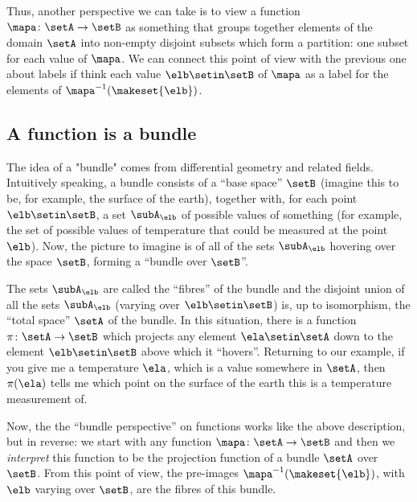 Thus, another perspective we can take is to view a function $\mapa \colon \setA \to \setB$ as something that groups together elements of the domain $\setA$ into non-empty disjoint subsets which form a partition: one subset for each value of $\mapa$. We can connect this point of view with the previous one about labels if think each value $\elb \setin \setB$ of $\mapa$ as a label for the elements of $\mapa^{-1}(\makeset{\elb})$.


\subsection{A function is a bundle}

The idea of a "bundle" comes from differential geometry and related fields. Intuitively speaking, a bundle consists of a ``base space'' $\setB$ (imagine this to be, for example, the surface of the earth), together with, for each point $\elb \setin \setB$, a set $\subA_\elb$ of possible values of something (for example, the set of possible values of temperature that could be measured at the point $\elb$). Now, the picture to imagine is of all of the sets $\subA_\elb$ hovering over the space $\setB$, forming a ``bundle over $\setB$''. 

The sets $\subA_\elb$ are called the ``fibres'' of the bundle and the disjoint union of all the sets $\subA_\elb$ (varying over $\elb \setin \setB$) is, up to isomorphism, the ``total space'' $\setA$ of the bundle. In this situation, there is a function $\pi \colon \setA \to \setB$ which projects any element $\ela \setin \setA$ down to the element $\elb \setin \setB$ above which it ``hovers''. Returning to our example, if you give me a temperature $\ela$, which is a value somewhere in $\setA$, then $\pi(\ela)$ tells me which point on the surface of the earth this is a temperature measurement of. 

Now, the the ``bundle perspective'' on functions works like the above description, but in reverse: we start with any function $\mapa \colon \setA \to \setB$ and then we \emph{interpret} this function to be the projection function of a bundle $\setA$ over $\setB$. From this point of view, the pre-images $\mapa^{-1}(\makeset{\elb})$, with $\elb$ varying over $\setB$, are the fibres of this bundle. 
 




